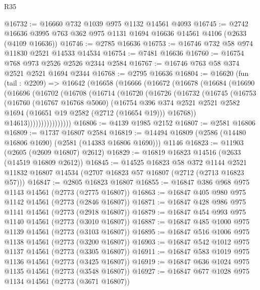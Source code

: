 \begin{lexlean}{R35}
\begin{coremodule}
@16732 := @16660 @732 @1039 @975 @1132 @14561 @4093
@16745 := @2742 @16636 @3995 @763 @362 @975 @1131 @1694 @16636 @14561 @4106 (@2633 (@4109 @16636))
@16746 := @2785 @16636
@16753 := @16746 @732 @58 @974 @11830 @2521 @14533 @14534
@16754 := @7481 @16636
@16760 := @16754 @768 @973 @2526 @2526 @2344 @2584
@16767 := @16746 @763 @58 @374 @2521 @2521 @1694 @2344
@16768 := @2795 @16636
@16804 := @16620
    (fun (tail : @2209) =>
    @16642
      (@16658
        (@16666
          (@16672
            (@16678
              (@16684
                (@16690
                  (@16696
                    (@16702
                      (@16708
                        (@16714
                          (@16720
                            (@16726
                              (@16732
                                (@16745
                                  (@16753
                                    (@16760
                                      (@16767 @16768 @5060)
                                      (@16754
                                        @396
                                        @374
                                        @2521
                                        @2521
                                        @2582
                                        @1694
                                        (@16651 @19 @2582 (@2712 (@16654 @19)))
                                        @16768))
                                    @14613))))))))))))))))
@16806 := @4139 @1985 @2152
@16807 := @2581 @16806
@16809 := @1737 @16807 @2584
@16819 := @14494 @16809 (@2586 (@14480 @16806 @1690) (@2581 (@14383 @16806 @1690))) @1146
@16823 := @11903 (@2605 (@2609 @16807) @2612)
@16829 := @16819 @16823 @14516 (@2633 (@14519 @16809 @2612))
@16845 := @14525
    @16823
    @58
    @372
    @1144
    @2521
    @11832
    @16807
    @14534
    (@2707 @16823 @57 @16807 (@2712 (@2713 @16823 @57)))
@16847 := @2805 @16823 @16807
@16855 := @16847 @386 @968 @975 @1143 @14561 (@2773 (@2775 @16807))
@16863 := @16847 @405 @980 @975 @1142 @14561 (@2773 (@2846 @16807))
@16871 := @16847 @428 @986 @975 @1141 @14561 (@2773 (@2918 @16807))
@16879 := @16847 @454 @993 @975 @1140 @14561 (@2773 (@3010 @16807))
@16887 := @16847 @485 @1000 @975 @1139 @14561 (@2773 (@3103 @16807))
@16895 := @16847 @516 @1006 @975 @1138 @14561 (@2773 (@3200 @16807))
@16903 := @16847 @542 @1012 @975 @1137 @14561 (@2773 (@3305 @16807))
@16911 := @16847 @583 @1019 @975 @1136 @14561 (@2773 (@3425 @16807))
@16919 := @16847 @636 @1024 @975 @1135 @14561 (@2773 (@3548 @16807))
@16927 := @16847 @677 @1028 @975 @1134 @14561 (@2773 (@3671 @16807))

\end{coremodule}
\end{lexlean}
